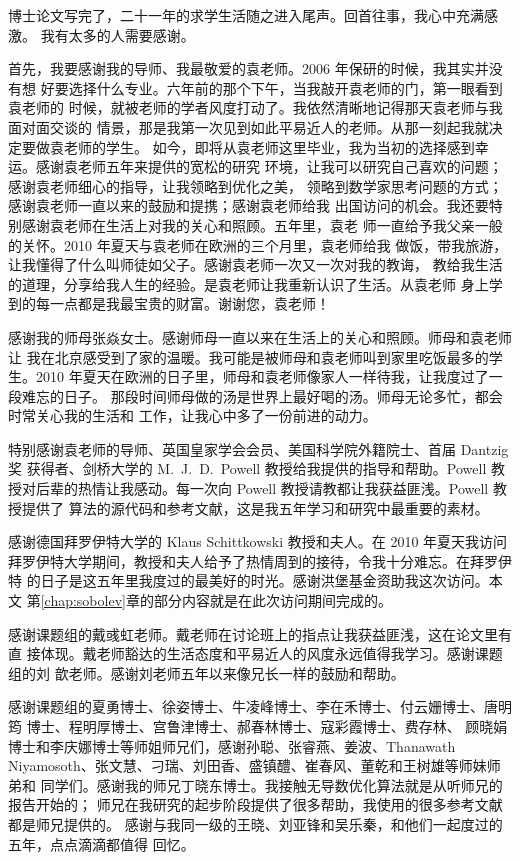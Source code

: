
\begin{thanks}
博士论文写完了，二十一年的求学生活随之进入尾声。回首往事，我心中充满感激。
我有太多的人需要感谢。

首先，我要感谢我的导师、我最敬爱的袁老师。2006 年保研的时候，我其实并没有想
好要选择什么专业。六年前的那个下午，当我敲开袁老师的门，第一眼看到袁老师的
时候，就被老师的学者风度打动了。我依然清晰地记得那天袁老师与我面对面交谈的
情景，那是我第一次见到如此平易近人的老师。从那一刻起我就决定要做袁老师的学生。
如今，即将从袁老师这里毕业，我为当初的选择感到幸运。感谢袁老师五年来提供的宽松的研究
环境，让我可以研究自己喜欢的问题；感谢袁老师细心的指导，让我领略到优化之美，
领略到数学家思考问题的方式；感谢袁老师一直以来的鼓励和提携；感谢袁老师给我
出国访问的机会。我还要特别感谢袁老师在生活上对我的关心和照顾。五年里，袁老
师一直给予我父亲一般的关怀。2010 年夏天与袁老师在欧洲的三个月里，袁老师给我
做饭，带我旅游，让我懂得了什么叫师徒如父子。感谢袁老师一次又一次对我的教诲，
教给我生活的道理，分享给我人生的经验。是袁老师让我重新认识了生活。从袁老师
身上学到的每一点都是我最宝贵的财富。谢谢您，袁老师！

感谢我的师母张焱女士。感谢师母一直以来在生活上的关心和照顾。师母和袁老师让
我在北京感受到了家的温暖。我可能是被师母和袁老师叫到家里吃饭最多的学生。2010 
年夏天在欧洲的日子里，师母和袁老师像家人一样待我，让我度过了一段难忘的日子。
那段时间师母做的汤是世界上最好喝的汤。师母无论多忙，都会时常关心我的生活和
工作，让我心中多了一份前进的动力。

特别感谢袁老师的导师、英国皇家学会会员、美国科学院外籍院士、首届 Dantzig 奖
获得者、剑桥大学的 \mbox{M. J. D. Powell} 教授给我提供的指导和帮助。Powell 
教授对后辈的热情让我感动。每一次向 Powell 教授请教都让我获益匪浅。Powell 教
授提供了 \newuoa 算法的源代码和参考文献，这是我五年学习和研究中最重要的素材。

感谢德国拜罗伊特大学的 Klaus Schittkowski 教授和夫人。在 2010 年夏天我访问
拜罗伊特大学期间，教授和夫人给予了热情周到的接待，令我十分难忘。在拜罗伊特
的日子是这五年里我度过的最美好的时光。感谢洪堡基金资助我这次访问。本文
第\ref{chap:sobolev}章的部分内容就是在此次访问期间完成的。

感谢课题组的戴彧虹老师。戴老师在讨论班上的指点让我获益匪浅，这在论文里有直
接体现。戴老师豁达的生活态度和平易近人的风度永远值得我学习。感谢课题组的刘
歆老师。感谢刘老师五年以来像兄长一样的鼓励和帮助。

感谢课题组的夏勇博士、徐姿博士、牛凌峰博士、李在禾博士、付云姗博士、唐明筠
博士、程明厚博士、宫鲁津博士、郝春林博士、寇彩霞博士、费存林、
顾晓娟博士和李庆娜博士等师姐师兄们，感谢孙聪、张睿燕、姜波、Thanawath 
Niyamosoth、张文慧、刁瑞、刘田香、盛镇醴、崔春风、董乾和王树雄等师妹师弟和
同学们。感谢我的师兄丁晓东博士。我接触无导数优化算法就是从听师兄的报告开始的；
师兄在我研究的起步阶段提供了很多帮助，我使用的很多参考文献都是师兄提供的。
感谢与我同一级的王晓、刘亚锋和吴乐秦，和他们一起度过的五年，点点滴滴都值得
回忆。


\end{thanks}

